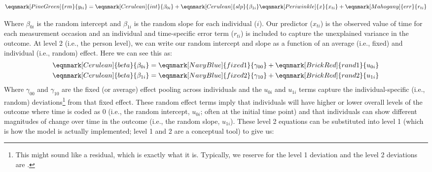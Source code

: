 \documentclass[11pt]{article}
\begin{document}
\begin{equation} \label{eq:1}
\eqnmark[PineGreen]{rm}{y_{ti}} = \eqnmark[Cerulean]{int}{\beta_{0i}} + \eqnmark[Cerulean]{slp}{\beta_{1i}}\eqnmark[Periwinkle]{x}{x_{ti}} + \eqnmark[Mahogany]{err}{r_{ti}}
\end{equation}
%

Where \textcolor{Cerulean}{$\beta_{0i}$} is the random intercept and $\beta_{1i}$ is the random slope for each individual ($i$). Our predictor ($x_{ti}$) is the observed value of time for each measurement occasion and an individual and time-specific error term ($r_{ti}$) is included to capture the unexplained variance in the outcome. At level 2 (i.e., the person level), we can write our random intercept and slope as a function of an average (i.e., fixed) and individual (i.e., random) effect. Here we can see this as:
%
\begin{equation} \label{eq:2}
\begin{split}
    & \eqnmark[Cerulean]{beta}{\beta_{0i}} = \eqnmark[NavyBlue]{fixed1}{\gamma_{00}} + \eqnmark[BrickRed]{rand1}{u_{0i}} \\
    & \eqnmark[Cerulean]{beta}{\beta_{1i}} = \eqnmark[NavyBlue]{fixed2}{\gamma_{10}} + \eqnmark[BrickRed]{rand2}{u_{1i}}
\end{split}
\end{equation}
%
Where $\gamma_{00}$ and $\gamma_{10}$ are the fixed (or average) effect pooling across individuals and the $u_{0i}$ and $u_{1i}$ terms capture the individual-specific (i.e., random) deviations\footnote{This might sound like a residual, which is exactly what it is. Typically, we reserve  for the level 1 deviation and the level 2 deviations are .} from that fixed effect. These random effect terms imply that individuals will have higher or lower overall levels of the outcome where time is coded as 0 (i.e., the random intercept, $u_{0i}$; often at the initial time point) and that individuals can show different magnitudes of change over time in the outcome (i.e., the random slope, $u_{1i}$). These level 2 equations can be substituted into level 1 (which is how the model is actually implemented; level 1 and 2 are a conceptual tool) to give us:
\end{document}
